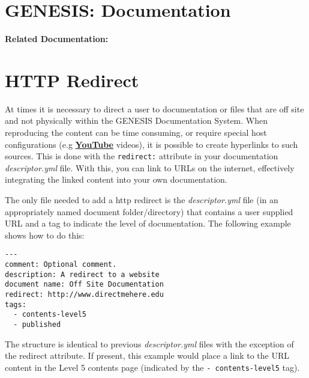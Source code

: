 \documentclass[12pt]{article}
\begin{document}
\section*{GENESIS: Documentation}

{\bf Related Documentation:}

\section*{HTTP Redirect}

At times it is necessary to direct a user to documentation or files that are off site and not physically within the GENESIS Documentation System. When reproducing the content can be time consuming, or require special host configurations (e.g \href{http://www.youtube.com/user/genesissim}{\bf YouTube} videos), it is possible to create hyperlinks to such sources. This is done with the {\tt redirect:} attribute in your documentation {\it descriptor.yml} file. With this, you can link to URLs on the internet, effectively integrating the linked content into your own documentation.

The only file needed to add a http redirect is the {\it descriptor.yml} file (in an appropriately named document folder/directory) that contains a user supplied URL and a tag to indicate the level of documentation. The following example shows how to do this:
\begin{verbatim}
---
comment: Optional comment.
description: A redirect to a website
document name: Off Site Documentation
redirect: http://www.directmehere.edu
tags:
  - contents-level5
  - published
\end{verbatim}
The structure is identical to previous {\it descriptor.yml} files with the exception of the redirect attribute. If present, this example would place a link to the URL content in the Level 5 contents page (indicated by the {\tt -\,contents-level5} tag).
\end{document}
